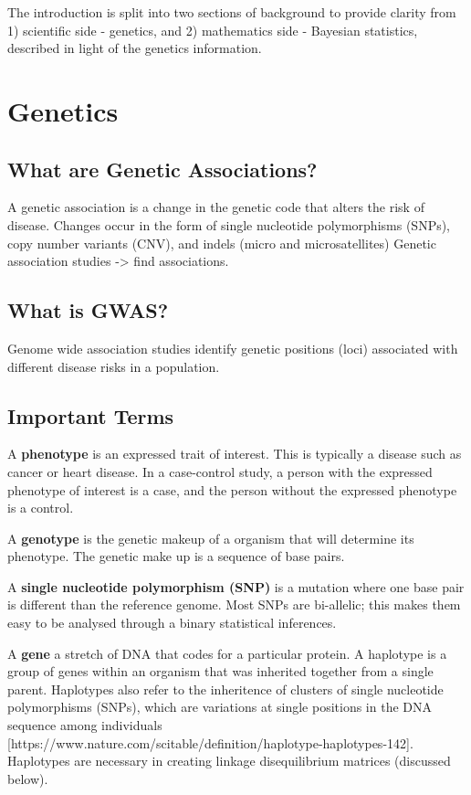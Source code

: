 The introduction is split into two sections of background to provide clarity from 1) scientific side - genetics, and 2) mathematics side - Bayesian statistics, described in light of the genetics information.

\section{Genetics}

\subsection{What are Genetic Associations?}
A genetic association is a change in the genetic code that alters the risk of disease. Changes occur in the form of single nucleotide polymorphisms (SNPs), copy number variants (CNV), and indels (micro and microsatellites) 
Genetic association studies -> find associations.

\subsection{What is GWAS?}
Genome wide association studies identify genetic positions (loci) associated with different disease risks in a population. 

\subsection{Important Terms}


A \textbf{phenotype} is an expressed trait of interest. This is typically a disease such as cancer or heart disease. In a case-control study, a person with the expressed phenotype of interest is a case, and the person without the expressed phenotype is a control. 

A \textbf{genotype} is the genetic makeup of a organism that will determine its phenotype. The genetic make up is a sequence of base pairs.

A \textbf{single nucleotide polymorphism (SNP)} is a mutation where one base pair is different than the reference genome. Most SNPs are bi-allelic; this makes them easy to be analysed through a binary statistical inferences. 

A \textbf{gene} a stretch of DNA that codes for a particular protein. A haplotype is a group of genes within an organism that was inherited together from a single parent. Haplotypes also refer to the inheritence of clusters of single nucleotide polymorphisms (SNPs), which are variations at single positions in the DNA sequence among individuals [https://www.nature.com/scitable/definition/haplotype-haplotypes-142]. Haplotypes are necessary in creating linkage disequilibrium matrices (discussed below). 


